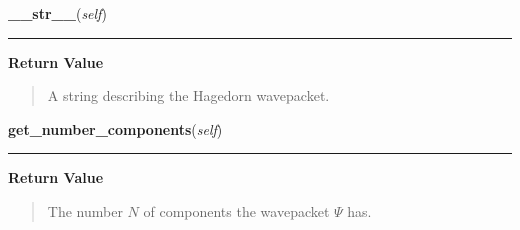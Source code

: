     \vspace{0.5ex}

\hspace{.8\funcindent}\begin{boxedminipage}{\funcwidth}

    \raggedright \textbf{\_\_str\_\_}(\textit{self})

    \vspace{-1.5ex}

    \rule{\textwidth}{0.5\fboxrule}
\setlength{\parskip}{2ex}
\setlength{\parskip}{1ex}
      \textbf{Return Value}
    \vspace{-1ex}

      \begin{quote}
      A string describing the Hagedorn wavepacket.

      \end{quote}

    \end{boxedminipage}

    \label{HagedornMultiWavepacket:HagedornMultiWavepacket:get_number_components}

    \vspace{0.5ex}

\hspace{.8\funcindent}\begin{boxedminipage}{\funcwidth}

    \raggedright \textbf{get\_number\_components}(\textit{self})

    \vspace{-1.5ex}

    \rule{\textwidth}{0.5\fboxrule}
\setlength{\parskip}{2ex}
\setlength{\parskip}{1ex}
      \textbf{Return Value}
    \vspace{-1ex}

      \begin{quote}
      The number $N$ of components the wavepacket $\Psi$
      has.

      \end{quote}

    \end{boxedminipage}

    \label{HagedornMultiWavepacket:HagedornMultiWavepacket:set_coefficients}

